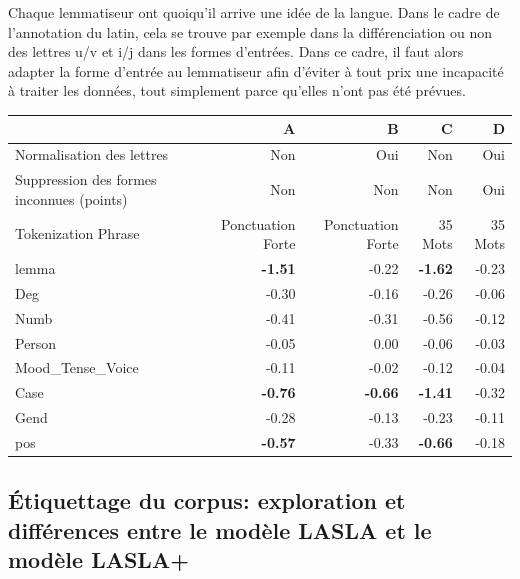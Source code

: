 Chaque lemmatiseur ont quoiqu'il arrive une idée de la langue. Dans le cadre de l'annotation du latin, cela se trouve par exemple dans la différenciation ou non des lettres u/v et i/j dans les formes d'entrées. Dans ce cadre, il faut alors adapter la forme d'entrée au lemmatiseur afin d'éviter à tout prix une incapacité à traiter les données, tout simplement parce qu'elles n'ont pas été prévues. %


\begin{table}[]
\begin{tabular}{l|rrrr}
\hline
                                          & A                 & B                 & C              & D              \\ \hline
Normalisation des lettres                 & Non               & Oui               & Non            & Oui            \\
Suppression des formes inconnues (points) & Non               & Non               & Non            & Oui            \\
Tokenization Phrase                       & Ponctuation Forte & Ponctuation Forte & 35 Mots        & 35 Mots        \\ \hline
lemma              & \textbf{-1.51} & -0.22          & \textbf{-1.62} & -0.23 \\
Deg                & -0.30          & -0.16          & -0.26          & -0.06 \\
Numb               & -0.41          & -0.31          & -0.56          & -0.12 \\
Person             & -0.05          & 0.00           & -0.06          & -0.03 \\
Mood\_Tense\_Voice & -0.11          & -0.02          & -0.12          & -0.04 \\
Case               & \textbf{-0.76} & \textbf{-0.66} & \textbf{-1.41} & -0.32 \\
Gend               & -0.28          & -0.13          & -0.23          & -0.11 \\
pos                & \textbf{-0.57} & -0.33          & \textbf{-0.66} & -0.18 \\ \hline
\end{tabular}
\end{table}

\subsection{Étiquettage du corpus: exploration et différences entre le modèle LASLA et le modèle LASLA+}
